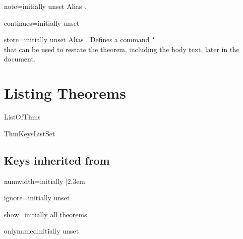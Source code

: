 \documentclass{ltxdoc}
\begin{document}
\begin{docKey}{note}{=}{initially unset}
Alias .
\end{docKey}

\begin{docKey}{continues}{=}{initially unset}

\end{docKey}

\begin{docKey}{store}{=}{initially unset}
Alias . Defines a command \texttt{\char`\\} that can be used to restate the theorem, including the body text, later in the document.
\end{docKey}

\section{Listing Theorems}

\begin{docCommand}{ListOfThms}{}

\end{docCommand}

\begin{docCommand}{ThmKeysListSet}{}

\end{docCommand}

\subsection{Keys inherited from }

\begin{docKey}{numwidth}{=}{initially |2.3em|}

\end{docKey}

\begin{docKey}{ignore}{=}{initially unset}

\end{docKey}

\begin{docKey}{show}{=}{initially all theorems}

\end{docKey}

\begin{docKey}{onlynamed}{}{initially unset}

\end{docKey}
\end{document}
